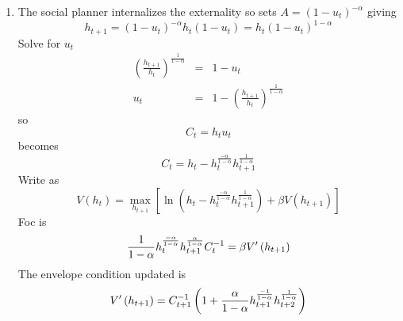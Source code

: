 \documentclass{article}
\begin{document}
\begin{enumerate}
\item The social planner internalizes the externality so sets $%
A=(1-u_{t})^{-\alpha }$ giving 
\begin{equation*}
h_{t+1}=(1-u_{t})^{-\alpha }h_{t}(1-u_{t})=h_{t}(1-u_{t})^{1-\alpha }
\end{equation*}%
Solve for $u_{t}$%
\begin{eqnarray*}
\left( \frac{h_{t+1}}{h_{t}}\right) ^{\frac{1}{1-\alpha }} &=&1-u_{t} \\
u_{t} &=&1-\left( \frac{h_{t+1}}{h_{t}}\right) ^{\frac{1}{1-\alpha }}
\end{eqnarray*}%
so%
\begin{equation*}
C_{t}=h_{t}u_{t}
\end{equation*}%
becomes%
\begin{equation*}
C_{t}=h_{t}-h_{t}^{\frac{-\alpha }{1-\alpha }}h_{t+1}^{\frac{1}{1-\alpha }}
\end{equation*}%
Write as 
\begin{equation*}
V\left( h_{t}\right) =\underset{h_{t+1}}{\max }\left[ \ln \left(
h_{t}-h_{t}^{\frac{-\alpha }{1-\alpha }}h_{t+1}^{\frac{1}{1-\alpha }}\right)
+\beta V\left( h_{t+1}\right) \right]
\end{equation*}%
Foc is%
\begin{equation*}
\frac{1}{1-\alpha }h_{t}^{\frac{-\alpha }{1-\alpha }}h_{t+1}^{\frac{\alpha }{%
1-\alpha }}C_{t}^{-1}=\beta V^{\prime }\left( h_{t+1}\right)
\end{equation*}%
The envelope condition updated is%
\begin{equation*}
V^{\prime }\left( h_{t+1}\right) =C_{t+1}^{-1}\left( 1+\frac{\alpha }{%
1-\alpha }h_{t+1}^{\frac{-1}{1-\alpha }}h_{t+2}^{\frac{1}{1-\alpha }}\right)
\end{equation*}


\end{enumerate}
\end{document}
